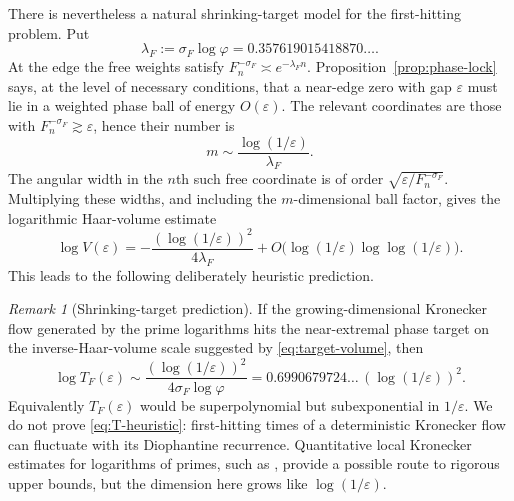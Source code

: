 \documentclass[11pt]{article}
\theoremstyle{remark}
\newtheorem{remark}[theorem]{Remark}
\begin{document}
There is nevertheless a natural shrinking-target model for the first-hitting problem.  Put
\[
\lambda_F:=\sigma_F\log\varphi
=0.357619015418870\ldots.
\]
At the edge the free weights satisfy
$F_n^{-\sigma_F}\asymp e^{-\lambda_F n}$.  Proposition~\ref{prop:phase-lock} says, at the level of necessary conditions, that a near-edge zero with gap $\varepsilon$ must lie in a weighted phase ball of energy $O(\varepsilon)$.  The relevant coordinates are those with $F_n^{-\sigma_F}\gtrsim\varepsilon$, hence their number is
\[
m\sim\frac{\log(1/\varepsilon)}{\lambda_F}.
\]
The angular width in the $n$th such free coordinate is of order
$\sqrt{\varepsilon/F_n^{-\sigma_F}}$.  Multiplying these widths, and including the $m$-dimensional ball factor, gives the logarithmic Haar-volume estimate
\begin{equation}\label{eq:target-volume}
\log V(\varepsilon)
=-\frac{(\log(1/\varepsilon))^2}{4\lambda_F}
+O\bigl(\log(1/\varepsilon)\log\log(1/\varepsilon)\bigr).
\end{equation}
This leads to the following deliberately heuristic prediction.

\begin{remark}[Shrinking-target prediction]\label{rem:height-heuristic}
If the growing-dimensional Kronecker flow generated by the prime logarithms hits the near-extremal phase target on the inverse-Haar-volume scale suggested by \eqref{eq:target-volume}, then
\begin{equation}\label{eq:T-heuristic}
\log T_F(\varepsilon)
\sim\frac{(\log(1/\varepsilon))^2}{4\sigma_F\log\varphi}
=0.6990679724\ldots\,(\log(1/\varepsilon))^2.
\end{equation}
Equivalently $T_F(\varepsilon)$ would be superpolynomial but subexponential in $1/\varepsilon$.  We do not prove \eqref{eq:T-heuristic}: first-hitting times of a deterministic Kronecker flow can fluctuate with its Diophantine recurrence.  Quantitative local Kronecker estimates for logarithms of primes, such as \cite{KorolevRezvyakova2022}, provide a possible route to rigorous upper bounds, but the dimension here grows like $\log(1/\varepsilon)$.
\end{remark}
\end{document}
